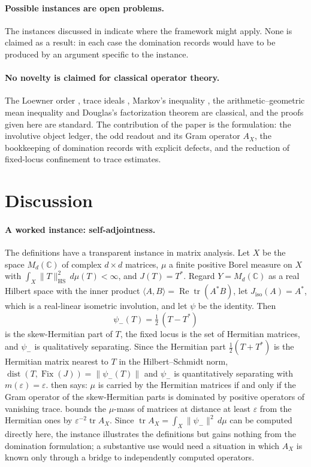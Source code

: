 \documentclass[11pt]{article}
\DeclareMathOperator{\Fix}{Fix}
\DeclareMathOperator{\dist}{dist}
\DeclareMathOperator{\trace}{tr}
\newcommand{\psim}{\psi_{-}}
\newcommand{\AX}{A_{X}}
\newcommand{\Jiso}{J_{\mathrm{iso}}}
\theoremstyle{definition}
\begin{document}
\paragraph{Possible instances are open problems.}
The instances discussed in  indicate where the
framework might apply.  None is claimed as a result: in each case the
domination records would have to be produced by an argument specific
to the instance.

\paragraph{No novelty is claimed for classical operator theory.}
The Loewner order \citep{Loewner1934,Bhatia1997,HornJohnson2013},
trace ideals \citep{Simon2005,ReedSimon1980}, Markov's inequality
\citep{Folland1999}, the arithmetic--geometric mean inequality
\citep{HardyLittlewoodPolya1952} and Douglas's factorization theorem
\citep{Douglas1966} are classical, and the proofs given here are
standard.  The contribution of the paper is the formulation: the
involutive object ledger, the odd readout and its Gram operator
\(\AX\), the bookkeeping of domination records with explicit defects,
and the reduction of fixed-locus confinement to trace estimates.
 \section{Discussion}
\label{sec:discussion}

\paragraph{A worked instance: self-adjointness.}
The definitions have a transparent instance in matrix analysis.  Let
\(X\) be the space \(M_d(\mathbb C)\) of complex \(d\times d\) matrices,
\(\mu\) a finite positive Borel measure on \(X\) with
\(\int_X\|T\|_{\mathrm{HS}}^2\,d\mu(T)<\infty\), and \(J(T)=T^*\).
Regard \(Y=M_d(\mathbb C)\) as a real Hilbert space with the inner
product \(\langle A,B\rangle=\operatorname{Re}\operatorname{tr}(A^*B)\),
let \(\Jiso(A)=A^*\), which is a real-linear isometric involution, and
let \(\psi\) be the identity.  Then
\[
  \psim(T)=\tfrac12\,(T-T^*)
\]
is the skew-Hermitian part of \(T\), the fixed locus is the set of
Hermitian matrices, and \(\psim\) is qualitatively separating.  Since
the Hermitian part \(\tfrac12(T+T^*)\) is the Hermitian matrix nearest
to \(T\) in the Hilbert--Schmidt norm, \(\dist(T,\Fix(J))=\|\psim(T)\|\)
and \(\psim\) is quantitatively separating with \(m(\varepsilon)=\varepsilon\).
 then says: \(\mu\) is
carried by the Hermitian matrices if and only if the Gram operator of
the skew-Hermitian parts is dominated by positive operators of
vanishing trace.  
bounds the \(\mu\)-mass of matrices at distance at least \(\varepsilon\)
from the Hermitian ones by \(\varepsilon^{-2}\trace\AX\).  Since
\(\trace\AX=\int_X\|\psim\|^2\,d\mu\) can be computed directly here,
the instance illustrates the definitions but gains nothing from the
domination formulation; a substantive use would need a situation in
which \(\AX\) is known only through a bridge to independently computed
operators.
\end{document}
